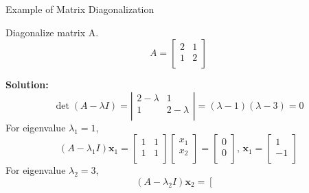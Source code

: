 \documentclass{beamer}
\begin{document}
        \begin{frame}{Example of Matrix Diagonalization}
        \begin{examples}
        Diagonalize matrix A.
        \begin{equation*}
            A=\left[ \begin{matrix}
            2&		1\\
            1&		2\\
        \end{matrix} \right]
        \end{equation*}
        \end{examples}
        \textbf{Solution:}
        \begin{equation*}
            \det \left( A-\lambda I \right) =\left| \begin{matrix}
            2-\lambda&		1\\
            1&		2-\lambda\\
        \end{matrix} \right|=\left( \lambda -1 \right) \left( \lambda -3 \right) =0
        \end{equation*}
        For eigenvalue $\lambda_1=1$,
        \begin{equation*}
            \left( A-\lambda_1 I \right) \mathbf{x}_1=\left[ \begin{matrix}
            1&		1\\
            1&		1\\
        \end{matrix} \right] \left[ \begin{array}{c}
            x_1\\
            x_2\\
        \end{array} \right] =\left[ \begin{array}{c}
            0\\
            0\\
        \end{array} \right] , \, \mathbf{x}_1=\left[ \begin{array}{c}
            1\\
            -1\\
        \end{array} \right]
        \end{equation*}
        For eigenvalue $\lambda_2=3$,
        \begin{equation*}
            \left( A-\lambda_2 I \right) \mathbf{x}_2=\left[ \begin{matrix}

\end{matrix}
\end{equation*}
\end{frame}
\end{document}
